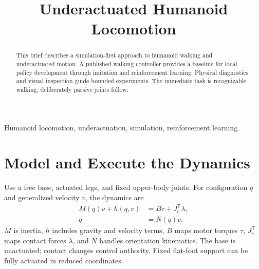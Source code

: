 

\title{Underactuated Humanoid Locomotion}
\author{
}
\date{}


\maketitle

\begin{abstract}
This brief describes a simulation-first approach to humanoid walking and
underactuated motion. A published walking controller provides a baseline for
local policy development through imitation and reinforcement learning.
Physical diagnostics and visual inspection guide bounded experiments. The
immediate task is recognizable walking; deliberately passive joints follow.
\end{abstract}

\begin{IEEEkeywords}
Humanoid locomotion, underactuation, simulation, reinforcement learning.
\end{IEEEkeywords}

\balance
\section{Model and Execute the Dynamics}
Use a free base, actuated legs, and fixed upper-body joints. For configuration
$q$ and generalized velocity $v$, the dynamics are~\cite{tedrakeContact}
\begin{equation}
\begin{aligned}
M(q)\dot v+h(q,v)&=B\tau+J_c^{\mathsf T}\lambda,\\
\dot q&=N(q)v.
\end{aligned}
\end{equation}
$M$ is inertia, $h$ includes gravity and velocity terms, $B$ maps motor
torques $\tau$, $J_c^{\mathsf T}$ maps contact forces $\lambda$, and $N$
handles orientation kinematics. The base is unactuated; contact changes control
authority. Fixed flat-foot support can be fully actuated in reduced coordinates.

